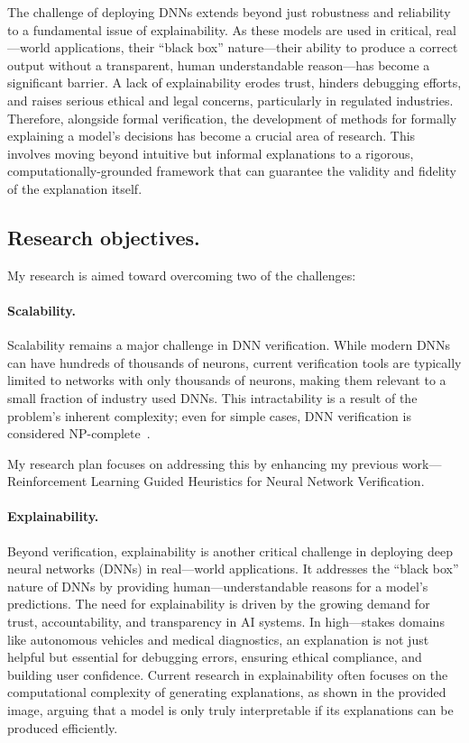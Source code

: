 \documentclass{llncs}
\begin{document}
The challenge of deploying DNNs extends beyond just robustness and reliability to a fundamental issue of explainability. 
As these models are used in critical, real---world applications, their ``black box'' nature—their ability to produce a correct output without a transparent, 
human understandable reason—has become a significant barrier. A lack of explainability erodes trust, hinders debugging efforts, 
and raises serious ethical and legal concerns, particularly in regulated industries. Therefore, alongside formal verification, 
the development of methods for formally explaining a model's decisions has become a crucial area of research. 
This involves moving beyond intuitive but informal explanations to a rigorous, computationally-grounded framework that can guarantee the 
validity and fidelity of the explanation itself.

\subsection{Research objectives.}
My research is aimed toward overcoming two of the challenges:
\paragraph{Scalability.} Scalability remains a major challenge in DNN verification. 
While modern DNNs can have hundreds of thousands of neurons, current verification tools 
are typically limited to networks with only thousands of neurons, making them relevant to 
a small fraction of industry used DNNs. This intractability is a result of the problem's inherent complexity; 
even for simple cases, DNN verification is considered NP-complete~\cite{KBD17}.

My research plan focuses on addressing this by enhancing my previous work--- Reinforcement Learning Guided 
Heuristics for Neural Network Verification.
\paragraph{Explainability.}
Beyond verification, explainability is another critical challenge in deploying deep neural networks (DNNs) 
in real---world applications. It addresses the ``black box'' nature of DNNs by providing human---understandable 
reasons for a model's predictions. The need for explainability is driven by the growing demand for trust, 
accountability, and transparency in AI systems. In high---stakes domains like autonomous vehicles and medical 
diagnostics, an explanation is not just helpful but essential for debugging errors, ensuring ethical compliance, 
and building user confidence. Current research in explainability often focuses on the computational complexity 
of generating explanations, as shown in the provided image, arguing that a model is only truly interpretable 
if its explanations can be produced efficiently.
\end{document}
